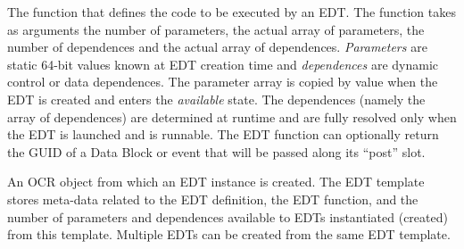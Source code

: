 %
%
\glossarydefstart
The function that defines the code to be executed by an EDT. The function
takes as arguments the number of parameters, the actual array of
parameters, the number of dependences and the actual array of
dependences. \emph{Parameters} are static 64-bit values known at EDT
creation time and \emph{dependences} are dynamic control or data
dependences. The parameter array is copied by value when the EDT is
created and enters the \emph{available} state. The dependences (namely the array of dependences) are
determined at runtime and are fully resolved only when the EDT is launched and
is runnable. The EDT function can optionally return the GUID of a Data Block or
event that will be passed along its ``post'' slot.

\glossarydefend
{}
\glossarydefstart
An OCR object from which an EDT instance is created. The EDT template
stores meta-data related to the EDT definition, the EDT function, and
the number of parameters and dependences available to EDTs
instantiated (created) from this template. Multiple EDTs can be created from the
same EDT template.
\glossarydefend


